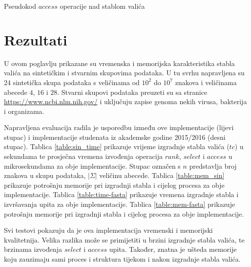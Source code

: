 \documentclass[times, utf8, seminar, numeric]{fer}
\begin{document}
\begin{algorithm}[H]
 \caption{Pseudokod $access$ operacije nad stablom valića}
 \label{alg:wt-access}
\end{algorithm}


\chapter{Rezultati}
\label{sec:results}

U ovom poglavlju prikazane su vremenska i memorijska karakteristika stabla valića na sintetičkim i 
stvarnim skupovima podataka. U tu svrhu napravljena su 24 sintetička skupa podataka s veličinama
od $10^2$ do $10^7$ znakova i veličinama abecede $4$, $16$ i $28$. Stvarni skupovi podataka preuzeti 
su sa stranice \url{https://www.ncbi.nlm.nih.gov/} i uključuju zapise genoma nekih virusa, bakterija 
i organizama. 

Napravljena evaluacija radila je usporedbu između ove implementacije (lijevi stupac) i implementacije studenata iz akademske godine 2015/2016 (desni stupac). 
Tablica \ref{table:sin_time} prikazuje vrijeme izgradnje stabla valića ($tc$) u sekundama te prosječna vremena izvođenja operacija $rank$, $select$ i $access$ u mikrosekundama za obje implementacije. Stupac označen s $n$ predstavlja broj znakova u skupu podataka, $|\Sigma|$ veličinu abecede.  
Tablica \ref{table:mem_sin} prikazuje potrošnju memorije pri izgradnji stabla i cijelog procesa za obje implementacije. 
Tablica \ref{table:time-fasta} prikazuje vremena izgradnje stabla i izvršavanja upita za obje implementacije. 
Tablica \ref{table:mem-fasta} prikazuje potrošnju memorije pri izgradnji stabla i cijelog procesa za obje implementacije.

Svi testovi pokazuju da je ova implementacija vremenski i memorijski kvalitetnija. Velika razlika
može se primijetiti u brzini izgradnje stabla valića, te brzinama izvođenja $select$ i $access$ 
upita. Također, znatna je ušteda memorije koju zauzimaju sami proces i struktura tijekom i nakon
izgradnje stabla valića.
\end{document}
